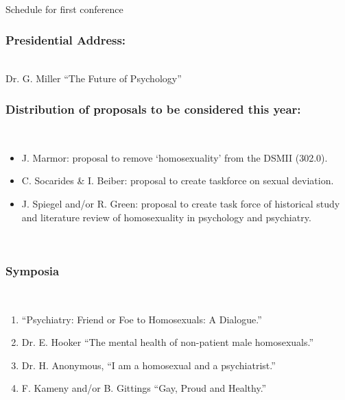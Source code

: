 \begin{refsection}
\begin{apatextbox}{Schedule for first conference}
\\

\subsubsection{Presidential Address:}
\label{presidentialaddress:}

\\

Dr. G. Miller “The Future of Psychology”\\

\subsubsection{Distribution of proposals to be considered this year:}
\label{distributionofproposalstobeconsideredthisyear:}

\\

\begin{itemize}
\item J. Marmor: proposal to remove `homosexuality' from the DSMII (302.0).

\item C. Socarides \& I. Beiber: proposal to create taskforce on sexual deviation.

\item J. Spiegel and\slash or R. Green: proposal to create task force of historical study and literature review of homosexuality in psychology and psychiatry.

\end{itemize}

\\

\subsubsection{Symposia}
\label{symposia}

\\

\begin{enumerate}
\item “Psychiatry: Friend or Foe to Homosexuals: A Dialogue.”

\item Dr. E. Hooker “The mental health of non-patient male homosexuals.”

\item Dr. H. Anonymous, “I am a homosexual and a psychiatrist.”

\item F. Kameny and\slash or B. Gittings “Gay, Proud and Healthy.”


\end{enumerate}
\end{apatextbox}
\end{refsection}
